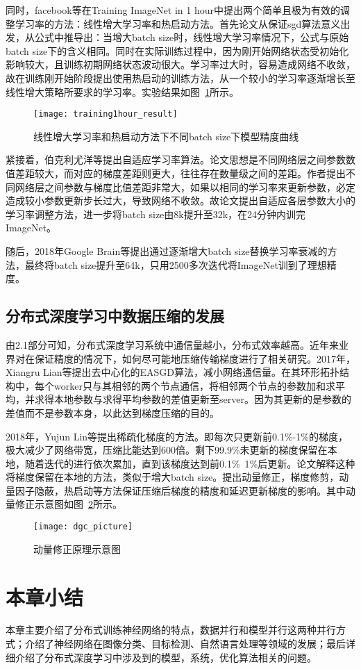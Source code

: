 同时，facebook等在Training ImageNet in 1 hour中提出两个简单且极为有效的调整学习率的方法：线性增大学习率和热启动方法。首先论文从保证sgd算法意义出发，从公式中推导出：当增大batch size时，线性增大学习率情况下，公式与原始batch size下的含义相同。同时在实际训练过程中，因为刚开始网络状态受初始化影响较大，且训练初期网络状态波动很大。学习率过大时，容易造成网络不收敛，故在训练刚开始阶段提出使用热启动的训练方法，从一个较小的学习率逐渐增长至线性增大策略所要求的学习率。实验结果如图~\ref{fig:training1hour_result}所示。

\begin{figure}[htp]
\centering
\texttt{[image: training1hour\_result]}
\caption{线性增大学习率和热启动方法下不同batch size下模型精度曲线}
\label{fig:training1hour_result}
\end{figure}
紧接着，伯克利尤洋等提出自适应学习率算法。论文思想是不同网络层之间参数数值差距较大，而对应的梯度差距则更大，往往存在数量级之间的差距。作者提出不同网络层之间参数与梯度比值差距非常大，如果以相同的学习率来更新参数，必定造成较小参数更新步长过大，导致网络不收敛。故论文提出自适应各层参数大小的学习率调整方法，进一步将batch size由8k提升至32k，在24分钟内训完ImageNet。

随后，2018年Google Brain等提出通过逐渐增大batch size替换学习率衰减的方法，最终将batch size提升至64k，只用2500多次迭代将ImageNet训到了理想精度。

\subsection{分布式深度学习中数据压缩的发展}
由2.1部分可知，分布式深度学习系统中通信量越小，分布式效率越高。近年来业界对在保证精度的情况下，如何尽可能地压缩传输梯度进行了相关研究。2017年，Xiangru Lian等提出去中心化的EASGD算法，减小网络通信量。在其环形拓扑结构中，每个worker只与其相邻的两个节点通信，将相邻两个节点的参数加和求平均，并求得本地参数与求得平均参数的差值更新至server。因为其更新的是参数的差值而不是参数本身，以此达到梯度压缩的目的。

2018年，Yujun Lin等提出稀疏化梯度的方法。即每次只更新前0.1\%-1\%的梯度，极大减少了网络带宽，压缩比能达到600倍。剩下99.9\%未更新的梯度保留在本地，随着迭代的进行依次累加，直到该梯度达到前0.1\%~1\%后更新。论文解释这种将梯度保留在本地的方法，类似于增大batch size。提出动量修正，梯度修剪，动量因子隐蔽，热启动等方法保证压缩后梯度的精度和延迟更新梯度的影响。其中动量修正示意图如图~\ref{fig:dgc_picture}所示。
\begin{figure}[htp]
\centering
\texttt{[image: dgc\_picture]}
\caption{动量修正原理示意图}
\label{fig:dgc_picture}
\end{figure}

\section{本章小结}
本章主要介绍了分布式训练神经网络的特点，数据并行和模型并行这两种并行方式；介绍了神经网络在图像分类、目标检测、自然语言处理等领域的发展；最后详细介绍了分布式深度学习中涉及到的模型，系统，优化算法相关的问题。




